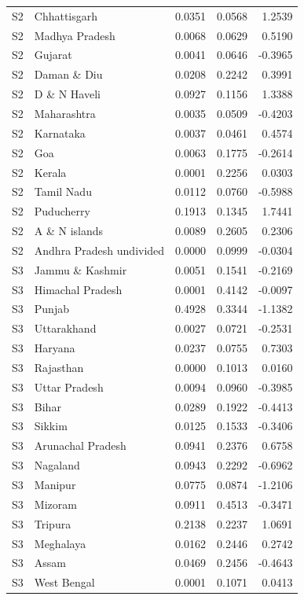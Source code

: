 \documentclass[11pt,a4paper]{report}
\begin{document}
\begin{longtable}{l>{\raggedright\arraybackslash}p{5cm}rrr}
S2 & Chhattisgarh & 0.0351 & 0.0568 & 1.2539 \\
S2 & Madhya Pradesh & 0.0068 & 0.0629 & 0.5190 \\
S2 & Gujarat & 0.0041 & 0.0646 & -0.3965 \\
S2 & Daman \& Diu & 0.0208 & 0.2242 & 0.3991 \\
S2 & D \& N Haveli & 0.0927 & 0.1156 & 1.3388 \\
S2 & Maharashtra & 0.0035 & 0.0509 & -0.4203 \\
S2 & Karnataka & 0.0037 & 0.0461 & 0.4574 \\
S2 & Goa & 0.0063 & 0.1775 & -0.2614 \\
S2 & Kerala & 0.0001 & 0.2256 & 0.0303 \\
S2 & Tamil Nadu & 0.0112 & 0.0760 & -0.5988 \\
S2 & Puducherry & 0.1913 & 0.1345 & 1.7441 \\
S2 & A \& N islands & 0.0089 & 0.2605 & 0.2306 \\
S2 & Andhra Pradesh undivided & 0.0000 & 0.0999 & -0.0304 \\
S3 & Jammu \& Kashmir & 0.0051 & 0.1541 & -0.2169 \\
S3 & Himachal Pradesh & 0.0001 & 0.4142 & -0.0097 \\
S3 & Punjab & 0.4928 & 0.3344 & -1.1382 \\
S3 & Uttarakhand & 0.0027 & 0.0721 & -0.2531 \\
S3 & Haryana & 0.0237 & 0.0755 & 0.7303 \\
S3 & Rajasthan & 0.0000 & 0.1013 & 0.0160 \\
S3 & Uttar Pradesh & 0.0094 & 0.0960 & -0.3985 \\
S3 & Bihar & 0.0289 & 0.1922 & -0.4413 \\
S3 & Sikkim & 0.0125 & 0.1533 & -0.3406 \\
S3 & Arunachal Pradesh & 0.0941 & 0.2376 & 0.6758 \\
S3 & Nagaland & 0.0943 & 0.2292 & -0.6962 \\
S3 & Manipur & 0.0775 & 0.0874 & -1.2106 \\
S3 & Mizoram & 0.0911 & 0.4513 & -0.3471 \\
S3 & Tripura & 0.2138 & 0.2237 & 1.0691 \\
S3 & Meghalaya & 0.0162 & 0.2446 & 0.2742 \\
S3 & Assam & 0.0469 & 0.2456 & -0.4643 \\
S3 & West Bengal & 0.0001 & 0.1071 & 0.0413 \\

\end{longtable}
\end{document}
